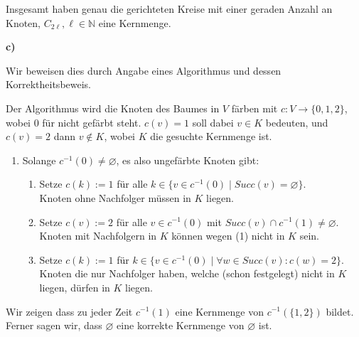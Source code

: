 \documentclass[a4paper,graphics,11pt]{article}
\begin{document}
Insgesamt haben genau die gerichteten Kreise mit einer geraden Anzahl an Knoten, $C_{2\ell}, \ell \in \mathbb{N}$
eine Kernmenge.

\newpage

\textbf{c)}

Wir beweisen dies durch Angabe eines Algorithmus und dessen Korrektheitsbeweis.

Der Algorithmus wird die Knoten des Baumes in $V$ färben mit $c: V \to \{0,1,2\}$, wobei $0$ für nicht gefärbt steht.
$c(v) = 1$ soll dabei $v \in K$ bedeuten, und $c(v) = 2$ dann $v \notin K$, wobei $K$ die gesuchte Kernmenge ist.

\begin{enumerate}
    \item Solange $c^{-1}(0) \neq \varnothing$, es also ungefärbte Knoten gibt:
        \begin{enumerate}
            \item Setze $c(k) := 1$ für alle $k \in \{v \in c^{-1}(0) \mid Succ(v) = \varnothing\}$.\\
                Knoten ohne Nachfolger müssen in $K$ liegen.\\

            \item Setze $c(v) := 2$ für alle $v \in c^{-1}(0)$ mit $Succ(v) \cap c^{-1}(1) \neq \varnothing$.\\
                Knoten mit Nachfolgern in $K$ können wegen (1) nicht in $K$ sein.\\

            \item Setze $c(k) := 1$ für $k \in \{v \in c^{-1}(0) \mid \forall w \in Succ(v): c(w) = 2\}$.\\
                Knoten die nur Nachfolger haben, welche (schon festgelegt) nicht in $K$ liegen, dürfen in $K$ liegen.
        \end{enumerate}
\end{enumerate}

Wir zeigen dass zu jeder Zeit $c^{-1}(1)$ eine Kernmenge von $c^{-1}(\{1,2\})$ bildet.
Ferner sagen wir, dass $\varnothing$ eine korrekte Kernmenge von $\varnothing$ ist.
\end{document}
